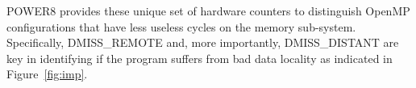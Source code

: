 POWER8 provides these unique set of hardware counters to distinguish OpenMP configurations that have less useless cycles on the memory sub-system. Specifically, DMISS\_REMOTE and, more importantly, DMISS\_DISTANT are key in identifying if the program suffers from bad data locality as indicated in Figure~\ref{fig:imp}.


